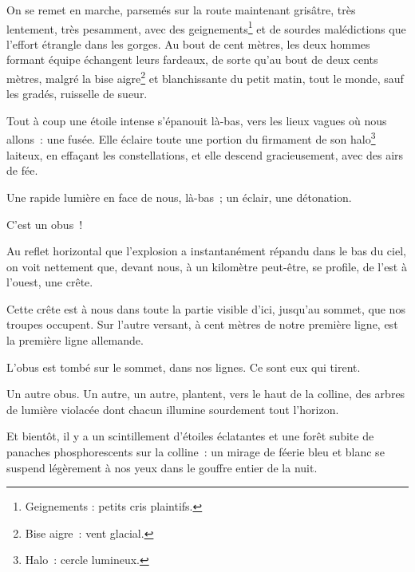 {

On se remet en marche, parsemés sur la route maintenant grisâtre, très
lentement, très pesamment, avec des geignements\footnote{Geignements
: petits cris plaintifs.} et de sourdes malédictions que l'effort
étrangle dans les gorges. Au bout de cent mètres, les deux hommes
formant équipe échangent leurs fardeaux, de sorte qu'au bout de deux
cents mètres, malgré la bise aigre\footnote{Bise aigre~: vent
glacial.} et blanchissante du petit matin, tout le monde, sauf les
gradés, ruisselle de sueur.

Tout à coup une étoile intense s'épanouit là-bas, vers les lieux
vagues où nous allons~: une fusée. Elle éclaire toute une portion du
firmament de son halo\footnote{Halo~: cercle lumineux.} laiteux, en
effaçant les constellations, et elle descend gracieusement, avec des
airs de fée.

Une rapide lumière en face de nous, là-bas~; un éclair, une
détonation.

C'est un obus~!

Au reflet horizontal que l'explosion a instantanément répandu dans le
bas du ciel, on voit nettement que, devant nous, à un kilomètre
peut-être, se profile, de l'est à l'ouest, une crête.

Cette crête est à nous dans toute la partie visible d'ici, jusqu'au
sommet, que nos troupes occupent. Sur l'autre versant, à cent mètres
de notre première ligne, est la première ligne allemande.

L'obus est tombé sur le sommet, dans nos lignes. Ce sont eux qui
tirent.

Un autre obus. Un autre, un autre, plantent, vers le haut de la
colline, des arbres de lumière violacée dont chacun illumine
sourdement tout l'horizon.

Et bientôt, il y a un scintillement d'étoiles éclatantes et une forêt
subite de panaches phosphorescents sur la colline~: un mirage de
féerie bleu et blanc se suspend légèrement à nos yeux dans le gouffre
entier de la nuit.

}
